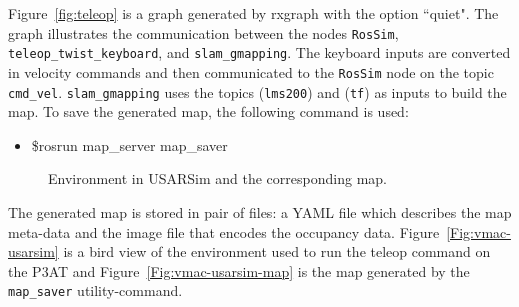 Figure~\ref{fig:teleop} is a graph generated by rxgraph with the option ``quiet". The graph illustrates the communication between the nodes \texttt{RosSim}, \texttt{teleop\_twist\_keyboard}, and \texttt{slam\_gmapping}. The keyboard inputs are converted in velocity commands and then communicated to the \texttt{RosSim} node on the topic \texttt{cmd\_vel}. \texttt{slam\_gmapping} uses the topics (\texttt{lms200}) and (\texttt{tf}) as inputs to build the map. To save the generated map, the following command is used:

\begin{itemize}
\item[]\$rosrun map\_server map\_saver
\end{itemize}

\begin{figure}[t!]
\centering
{}\qquad
{}
\caption{Environment in USARSim and the corresponding map.}
\end{figure}
The generated map is stored in pair of files: a YAML file which describes the map meta-data and the image file that encodes the occupancy data. Figure~\ref{Fig:vmac-usarsim} is a bird view of the environment used to run the teleop command on the P3AT and Figure~\ref{Fig:vmac-usarsim-map} is the map generated by the \texttt{map\_saver} utility-command.






